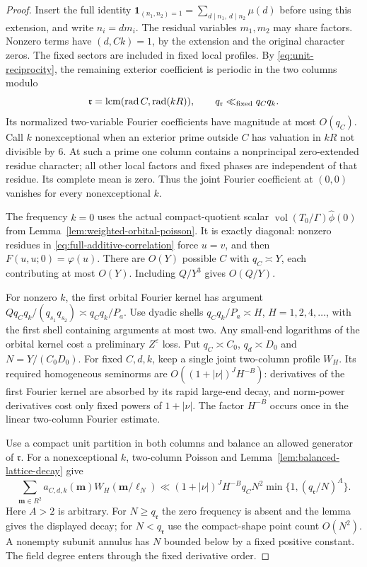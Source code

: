 \documentclass[11pt,a4paper]{article}
\numberwithin{equation}{section}
\theoremstyle{definition}
\theoremstyle{remark}
\newcommand{\eps}{\varepsilon}
\begin{document}
\begin{proof}
Insert the full identity
$\mathbf1_{(n_1,n_2)=1}=\sum_{d\mid n_1,\ d\mid n_2}\mu(d)$ before
using this extension, and write $n_i=dm_i$.  The residual variables $m_1,m_2$ may share factors.  Nonzero terms have $(d,Ck)=1$,
by the extension and the original character zeros.
The fixed sectors are included in fixed local profiles.  By
\eqref{eq:unit-reciprocity}, the remaining exterior coefficient is
periodic in the two columns modulo
\[
 \mathfrak r=\operatorname{lcm}(\operatorname{rad}C,
                              \operatorname{rad}(kR)),
 \qquad q_{\mathfrak r}\ll_{\rm fixed}q_Cq_k.
\]
Its normalized two-variable Fourier coefficients have magnitude at
most $O(q_C)$.  Call $k$ nonexceptional when an exterior prime outside
$C$ has valuation in $kR$ not divisible by $6$.  At such a prime one
column contains a nonprincipal zero-extended residue character; all
other local factors and fixed phases are independent of that residue.
Its complete mean is zero.  Thus the joint Fourier coefficient at
$(0,0)$ vanishes for every nonexceptional $k$.

The frequency $k=0$ uses the actual compact-quotient scalar
$\operatorname{vol}(T_0/\Gamma)\widehat\phi(0)$ from
Lemma~\ref{lem:weighted-orbital-poisson}.
It is exactly diagonal: nonzero residues in
\eqref{eq:full-additive-correlation} force $u=v$, and then
$F(u,u;0)=\varphi(u)$.  There are $O(Y)$ possible $C$ with $q_C\asymp Y$,
each contributing at most $O(Y)$.  Including $Q/Y^3$ gives $O(Q/Y)$.

For nonzero $k$, the first orbital Fourier kernel has argument
$Qq_Cq_k/(q_{s_1}q_{s_2})\asymp q_Cq_k/P_a$.
Use dyadic shells $q_Cq_k/P_a\asymp H$, $H=1,2,4,\ldots$, with the
first shell containing arguments at most two.  Any small-end
logarithms of the orbital kernel cost a preliminary $Z^\eps$ loss.
Put $q_C\asymp C_0$, $q_d\asymp D_0$ and
$N=Y/(C_0D_0)$.  For fixed $C,d,k$, keep a single joint two-column
profile $W_H$.  Its required homogeneous seminorms are
$O((1+|\nu|)^JH^{-B})$: derivatives of the first Fourier kernel are
absorbed by its rapid large-end decay, and norm-power derivatives cost
only fixed powers of $1+|\nu|$.  The factor $H^{-B}$ occurs once in the
linear two-column Fourier estimate.

Use a compact unit partition in both columns and balance an allowed
generator of $\mathfrak r$.  For a nonexceptional $k$, two-column
Poisson and Lemma~\ref{lem:balanced-lattice-decay} give
\begin{equation}\label{eq:gram-two-column-poisson}
 \sum_{\mathbf m\in R^2}a_{C,d,k}(\mathbf m)
                 W_H(\mathbf m/\ell_N)
 \ll(1+|\nu|)^JH^{-B}q_CN^2
                 \min\{1,(q_{\mathfrak r}/N)^A\}.
\end{equation}
Here $A>2$ is arbitrary.  For $N\ge q_{\mathfrak r}$ the zero
frequency is absent and the lemma gives the displayed decay; for
$N<q_{\mathfrak r}$ use the compact-shape point count $O(N^2)$.
A nonempty subunit annulus has $N$ bounded below by a fixed positive
constant.  The field degree enters through the fixed derivative order.


\end{proof}
\end{document}
